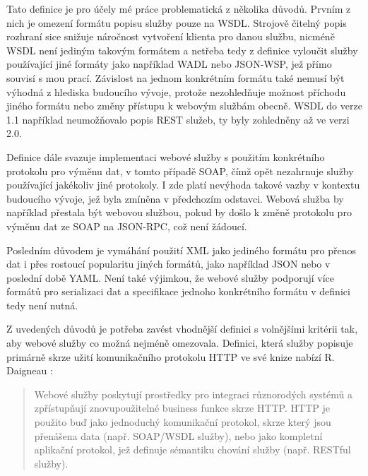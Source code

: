 \documentclass[czech,DP]{thesiskiv}
\begin{document}

Tato definice je pro účely mé práce problematická z několika důvodů. Prvním z nich je omezení formátu popisu služby pouze na WSDL. Strojově čitelný popis rozhraní sice snižuje náročnost vytvoření klienta pro danou službu, nicméně WSDL není jediným takovým formátem a netřeba tedy z definice vyloučit služby používající jiné formáty jako například WADL nebo JSON-WSP, jež přímo souvisí s mou prací. Závislost na jednom konkrétním formátu také nemusí být výhodná z hlediska budoucího vývoje, protože nezohledňuje možnost příchodu jiného formátu nebo změny přístupu k webovým službám obecně. WSDL do verze 1.1 například neumožňovalo popis REST služeb, ty byly zohledněny až ve verzi 2.0\cite{restWsdl}.  

Definice dále svazuje implementaci webové služby s použitím konkrétního protokolu pro výměnu dat, v tomto případě SOAP, čímž opět nezahrnuje služby používající jakékoliv jiné protokoly. I zde platí nevýhoda takové vazby v kontextu budoucího vývoje, jež byla zmíněna v předchozím odstavci. Webová služba by například přestala být webovou službou, pokud by došlo k změně protokolu pro výměnu dat ze SOAP na JSON-RPC, což není žádoucí.

Posledním důvodem je vymáhání použití XML jako jediného formátu pro přenos dat i přes rostoucí popularitu jiných formátů, jako například JSON nebo v poslední době YAML. Není také výjimkou, že webové služby podporují více formátů pro serializaci dat a specifikace jednoho konkrétního formátu v definici tedy není nutná. 

Z uvedených důvodů je potřeba zavést vhodnější definici s volnějšími kritérii tak, aby webové služby co možná nejméně omezovala. Definici, která služby popisuje primárně skrze užití komunikačního protokolu HTTP ve své knize nabízí R. Daigneau \cite{fromObjectsToWs}: 

\begin{quote}
	Webové služby poskytují prostředky pro integraci různorodých systémů a zpřístupňují znovupoužitelné business funkce skrze HTTP. HTTP je použito buď jako jednoduchý komunikační protokol, skrze který jsou přenášena data (např. SOAP/WSDL služby), nebo jako kompletní aplikační protokol, jež definuje sémantiku chování služby (např. RESTful služby).
\end{quote}
\end{document}
